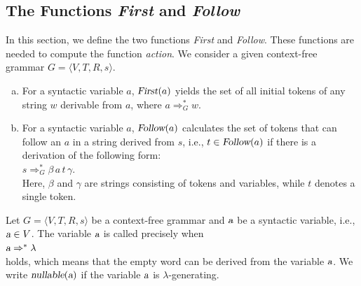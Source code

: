 \subsection{The Functions \textsl{First} and \textsl{Follow}\label{section:first-follow}}
In this section, we define the two functions \textsl{First} and \textsl{Follow}. These functions
are needed to compute the function \textsl{action}.
We consider a given context-free grammar \(G = \langle V, T, R, s \rangle\).
\begin{enumerate}[(a)]
\item For a syntactic variable \(a\), \(\textsl{First}(a)\) yields the set of all initial tokens of any
      string \(w\) derivable from \(a\), where \(a \Rightarrow_G^* w\).
\item For a syntactic variable \(a\), \(\textsl{Follow}(a)\) calculates the set of tokens
      that can follow an \(a\) in a string derived from \(s\), i.e., \(t \in \textsl{Follow}(a)\)
      if there is a derivation of the following form:
      \\[0.2cm]
      \hspace*{1.3cm}
      \(s \Rightarrow_G^* \beta\, a\, t\, \gamma\).
      \\[0.2cm]
      Here, \(\beta\) and \(\gamma\) are strings consisting of tokens and variables, while \(t\) denotes a single token.
\end{enumerate}

\begin{Definition}
Let \(G = \langle V, T, R, s \rangle\) be a context-free grammar and \(\textsl{a}\) be a
syntactic variable, i.e., \(\textsl{a} \in V\). The variable \(\textsl{a}\) is called 
 precisely when
\\[0.2cm]
\hspace*{1.3cm}
\(\textsl{a} \Rightarrow^* \lambda\)
\\[0.2cm]
holds, which means that the empty word can be derived from the variable \(\textsl{a}\). 
We write \(\textsl{nullable}(\textsl{a})\) if the variable \(\textsl{a}\) is $\lambda$-generating.
\eox
\end{Definition}

